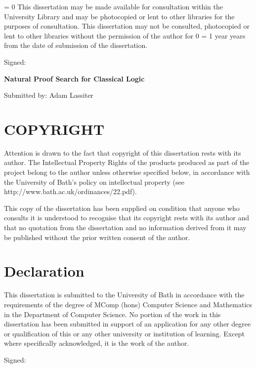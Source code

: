\maketitle
\newpage


\newcommand{\consultation}[1]{%
    \thispagestyle{empty}
    \ifnum #1 = 0
        This dissertation may be made available for consultation within the
        University Library and may be photocopied or lent to other libraries
        for the purposes of consultation.
    \else
        This dissertation may not be consulted, photocopied or lent to other
        libraries without the permission of the author for #1 
    \ifnum #1 = 1
        year
    \else
        years
    \fi
        from the date of submission of the dissertation.
    \fi
    \vspace{4em}

    Signed:
}
\consultation{0}
\newpage


\newcommand{\declaration}[2]{
    \thispagestyle{empty}
    \begin{center}
        \LARGE\textbf{#1}
    \end{center}
    \begin{center}
        Submitted by: #2
    \end{center}
    \section*{COPYRIGHT}
        Attention is drawn to the fact that copyright of this dissertation rests
        with its author. The Intellectual Property Rights of the products
        produced as part of the project belong to the author unless otherwise specified
        below, in accordance with the University of Bath's policy on intellectual property 
       (see http://www.bath.ac.uk/ordinances/22.pdf).

        This copy of the dissertation has been supplied on condition that anyone
        who consults it is understood to recognise that its copyright rests with its
        author and that no quotation from the dissertation and no information
        derived from it may be published without the prior written consent of
        the author.

    \section*{Declaration}
        This dissertation is submitted to the University of Bath in accordance
        with the requirements of the degree of MComp (hons) Computer Science and Mathematics in the
        Department of Computer Science. No portion of the work in this dissertation
        has been submitted in support of an application for any other degree
        or qualification of this or any other university or institution of learning.
        Except where specifically acknowledged, it is the work of the author.

        Signed:
}
\declaration{Natural Proof Search for Classical Logic}{Adam Lassiter}
\newpage


